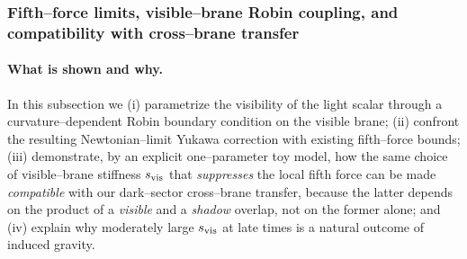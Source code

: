 \documentclass[10pt]{article}
\theoremstyle{definition}
\theoremstyle{plain}
\begin{document}
\subsubsection{Fifth–force limits, visible–brane Robin coupling, and compatibility with cross–brane transfer}
\label{subsubsec:fifthforce-robin}

\paragraph{What is shown and why.}\label{par:uom-main-101}
In this subsection we (i) parametrize the visibility of the light scalar through a curvature–dependent Robin boundary
condition on the visible brane; (ii) confront the resulting Newtonian--limit Yukawa correction with existing fifth–force
bounds; (iii) demonstrate, by an explicit one–parameter toy model, how the same choice of visible–brane stiffness
$s_{\rm vis}$ that \emph{suppresses} the local fifth force can be made \emph{compatible} with our dark–sector cross–brane transfer,
because the latter depends on the product of a \emph{visible} and a \emph{shadow} overlap, not on the former alone; and
(iv) explain why moderately large $s_{\rm vis}$ at late times is a natural outcome of induced gravity.
\end{document}
